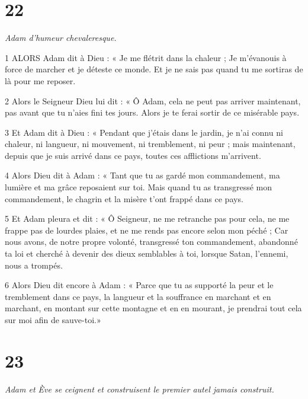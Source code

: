 \chapter{22}

\par \textit{Adam d'humeur chevaleresque.}

\par 1 ALORS Adam dit à Dieu : « Je me flétrit dans la chaleur ; Je m'évanouis à force de marcher et je déteste ce monde. Et je ne sais pas quand tu me sortiras de là pour me reposer.

\par 2 Alors le Seigneur Dieu lui dit : « Ô Adam, cela ne peut pas arriver maintenant, pas avant que tu n'aies fini tes jours. Alors je te ferai sortir de ce misérable pays.

\par 3 Et Adam dit à Dieu : « Pendant que j'étais dans le jardin, je n'ai connu ni chaleur, ni langueur, ni mouvement, ni tremblement, ni peur ; mais maintenant, depuis que je suis arrivé dans ce pays, toutes ces afflictions m’arrivent.

\par 4 Alors Dieu dit à Adam : « Tant que tu as gardé mon commandement, ma lumière et ma grâce reposaient sur toi. Mais quand tu as transgressé mon commandement, le chagrin et la misère t'ont frappé dans ce pays.

\par 5 Et Adam pleura et dit : « Ô Seigneur, ne me retranche pas pour cela, ne me frappe pas de lourdes plaies, et ne me rends pas encore selon mon péché ; Car nous avons, de notre propre volonté, transgressé ton commandement, abandonné ta loi et cherché à devenir des dieux semblables à toi, lorsque Satan, l'ennemi, nous a trompés.

\par 6 Alors Dieu dit encore à Adam : « Parce que tu as supporté la peur et le tremblement dans ce pays, la langueur et la souffrance en marchant et en marchant, en montant sur cette montagne et en en mourant, je prendrai tout cela sur moi afin de sauve-toi.»

\chapter{23}

\par \textit{Adam et Ève se ceignent et construisent le premier autel jamais construit.}


